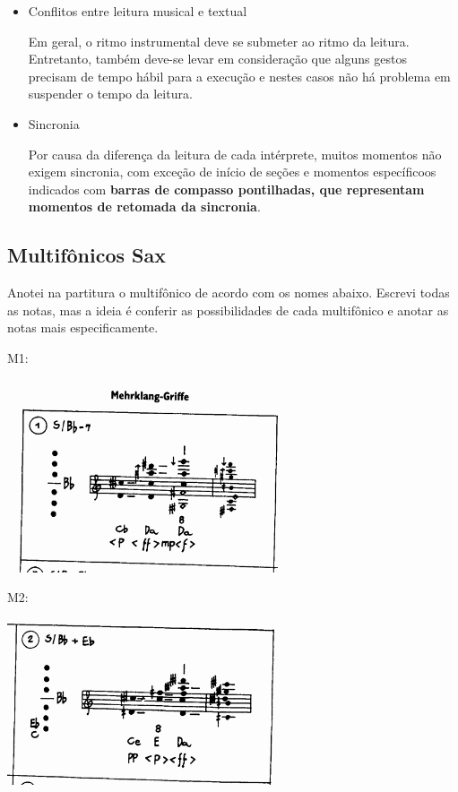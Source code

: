 \documentclass[article,12pt,openany,oneside,a4paper,chapter=TITLE,hyphen,english,brazil,chapter=TITLE,sumario=tradicional]{abntex2}
\begin{document}
\begin{itemize}
\item Conflitos entre leitura musical e textual
\label{sec:orgd691522}

Em geral, o ritmo instrumental deve se submeter ao ritmo da leitura. Entretanto, também deve-se levar em consideração que alguns gestos precisam de tempo hábil para a execução e nestes casos não há problema em suspender o tempo da leitura.

\item Sincronia
\label{sec:orgb247972}

Por causa da diferença da leitura de cada intérprete, muitos momentos não exigem sincronia, com exceção de início de seções e momentos específicoos indicados com  \textbf{barras de compasso pontilhadas, que representam momentos de retomada da sincronia}.
\end{itemize}

\subsection*{Multifônicos Sax}
\label{sec:orga2fb72c}

Anotei na partitura o multifônico de acordo com os nomes abaixo. Escrevi todas as notas, mas a ideia é conferir as possibilidades de cada multifônico e anotar as notas mais especificamente. 

M1:

\begin{center}
\includegraphics[width=8cm]{images/multi1.png}
\end{center}

M2:

\begin{center}
\includegraphics[width=8cm]{images/multi2.png}
\end{center}
\end{document}
